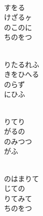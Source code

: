 \documentclass[10pt,b5j]{tarticle} %
\begin{document}
\vspace{1.5em} %
\newcommand{\linespace}{0.5em} %
\newcommand{\blocksize}{0.5\hsize} %
\newcommand{\itemmargin}{6em} %
\begin{enumerate} %
    \setlength{\itemindent}{\itemmargin} %
    \begin{minipage}[c]{\blocksize}
    
        \vspace{\linespace}
        \item~\\
        すをる\\
        けざるヶ\\
        のこのに\\
        ちのをつ
        
        \vspace{\linespace}
        \item~\\
        りたるれふ\\
        きをひへる\\
        のらず\\
        にひふ
        
        \vspace{\linespace}
        \item~\\
        りてり\\
        がるの\\
        のみつつ\\
        がふ
        
        \vspace{\linespace}
        \item~\\
        のはまりて\\
        じての\\
        りてみて\\
        ちのをつ
    
    \end{minipage}
\end{enumerate} %
\end{document}
